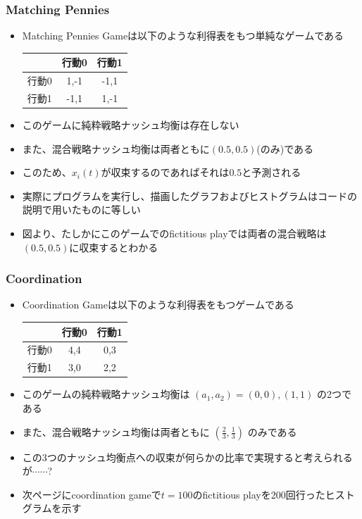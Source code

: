 \documentclass[dvipdfmx,fleqn,handout]{beamer}
\begin{document}
\begin{frame}
\frametitle{Matching Pennies}
\begin{itemize}\setlength{\parskip}{0.5em}

\item
Matching Pennies Gameは以下のような利得表をもつ単純なゲームである
 \begin{table}
 \begin{tabular}{|c|c|c|} \hline
    　 & 行動0 & 行動1 \\ \hline 
    行動0 & 1,-1 & -1,1 \\ \hline
    行動1 & -1,1 & 1,-1 \\ \hline
   \end{tabular}
  \end{table}\pause
\item
このゲームに純粋戦略ナッシュ均衡は存在しない\pause
\item
また、混合戦略ナッシュ均衡は両者ともに$(0.5,0.5)$(のみ)である \pause
\item
このため、$x_i(t)$が収束するのであればそれは$0.5$と予測される\pause
\item
実際にプログラムを実行し、描画したグラフおよびヒストグラムはコードの説明で用いたものに等しい
\item
図より、たしかにこのゲームでのfictitious playでは両者の混合戦略は$(0.5,0.5)$に収束するとわかる

\end{itemize}
\end{frame}

\begin{frame}
\frametitle{Coordination}
\begin{itemize}\setlength{\parskip}{0.5em}
\item
Coordination Gameは以下のような利得表をもつゲームである
 \begin{table}
 \begin{tabular}{|c|c|c|} \hline
    & 行動0 & 行動1 \\ \hline 
    行動0 & 4,4 & 0,3 \\ \hline
    行動1 & 3,0 & 2,2 \\ \hline
   \end{tabular}
  \end{table}\pause
\item
このゲームの純粋戦略ナッシュ均衡は
$(a_1,a_2)=(0,0),(1,1)$
の2つである\pause
\item
また、混合戦略ナッシュ均衡は両者ともに
$(\frac{2}{3},\frac{1}{3})$
のみである
\pause
\item
この3つのナッシュ均衡点への収束が何らかの比率で実現すると考えられるが$\cdots\cdots$?
\item
次ページにcoordination gameで$t=100$のfictitious playを200回行ったヒストグラムを示す
\end{itemize}
\end{frame}
\end{document}
